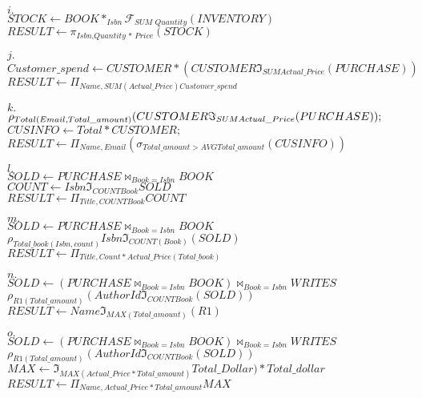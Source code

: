\documentclass{article}
\begin{document}
$i.$\\
$\textit{STOCK} \leftarrow \textit{BOOK} * _{\textit{Isbn}}\mathcal{F}_{\textit{SUM Quantity}}(\textit{INVENTORY})$\\
$\textit{RESULT} \leftarrow \pi_{\textit{Isbn}, \textit{Quantity * Price}}(\textit{STOCK})$
\hfill \break

$j.$\\
$Customer\_spend \leftarrow CUSTOMER * (CUSTOMER \Im_{SUM Actual\_Price}(PURCHASE))$\\
$RESULT \leftarrow \Pi_{Name,SUM(Actual\_Price)Customer\_spend}$
\hfill \break

$k.$\\
$\rho_{Total(Email,Total\_amount)}({\tiny CUSTOMER}{\huge \Im}_{SUM Actual\_Price}(PURCHASE));$ \\
$CUSINFO \leftarrow Total * CUSTOMER;$\\
$RESULT \leftarrow \Pi_{Name, Email}(\sigma_{Total\_amount > AVG Total\_amount}(CUSINFO))$
\hfill \break

$l.$\\
$SOLD \leftarrow PURCHASE \bowtie_{Book = Isbn} BOOK $\\
$COUNT \leftarrow Isbn \Im_{COUNT Book} SOLD$\\
$RESULT \leftarrow \Pi_{Title,COUNT Book} COUNT$
\hfill \break

$m.$\\
$SOLD \leftarrow PURCHASE \bowtie_{Book = Isbn} BOOK $\\
$\rho_{Total\_book(Isbn,count)} Isbn\Im_{COUNT(Book)}(SOLD)$\\
$RESULT \leftarrow \Pi_{Title,Count * Actual\_Price(Total\_book)}$
\hfill \break

$n.$\\
$SOLD \leftarrow (PURCHASE \bowtie_{Book = Isbn} BOOK)\bowtie_{Book = Isbn}WRITES$\\
$\rho_{R1(Total\_amount)}(AuthorId \Im_{COUNT Book}(SOLD))$\\
$RESULT \leftarrow Name \Im_{MAX(Total\_amount)}(R1)$
\hfill \break

$o.$\\
$SOLD \leftarrow (PURCHASE \bowtie_{Book = Isbn} BOOK)\bowtie_{Book = Isbn}WRITES$\\
$\rho_{R1(Total\_amount)}(AuthorId \Im_{COUNT Book}(SOLD))$\\
$MAX \leftarrow  \Im_{MAX(Actual\_Price*Total\_amount)}Total\_Dollar)*Total\_dollar$\\
$RESULT \leftarrow \Pi_{Name,Actual\_Price*Total\_amount}MAX$
\hfill \break
\end{document}
